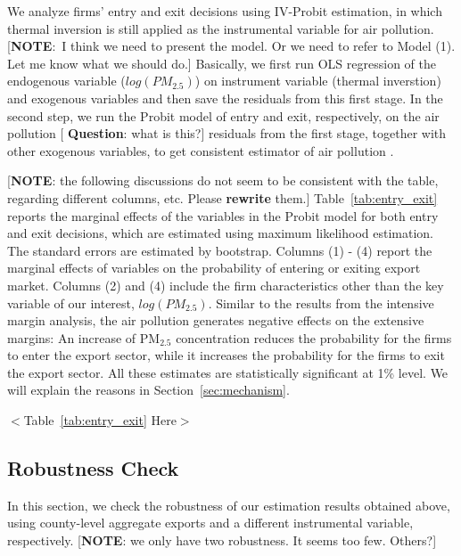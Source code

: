 \documentclass[12pt]{article}
\begin{document}
We analyze firms' entry and exit decisions using IV-Probit estimation, in
which thermal inversion is still applied as the instrumental variable for
air pollution. [\textbf{NOTE}:\ I think we need to present the model. Or we
need to refer to Model (1). Let me know what we should do.] Basically, we
first run OLS regression of the endogenous variable ($log(PM_{2.5})$) on
instrument variable (thermal inverstion) and exogenous variables and then
save the residuals from this first stage. In the second step, we run the
Probit model of entry and exit, respectively, on the air pollution [\textbf{%
Question}: what is this?] residuals from the first stage, together with
other exogenous variables, to get consistent estimator of air pollution %
\citep{wooldridge2010econometric}. 

[\textbf{NOTE}: the following discussions do not seem to be consistent with
the table, regarding different columns, etc. Please \textbf{rewrite} them.]
Table~\ref{tab:entry_exit} reports the marginal effects of the variables in
the Probit model for both entry and exit decisions, which are estimated
using maximum likelihood estimation. The standard errors are estimated by
bootstrap. Columns (1) - (4) report the marginal effects of variables on the
probability of entering or exiting export market. Columns (2) and (4)
include the firm characteristics other than the key variable of our
interest, $log(PM_{2.5})$. Similar to the results from the intensive margin
analysis, the air pollution generates negative effects on the extensive
margins: An increase of $\mathrm{PM_{2.5}}$ concentration reduces the
probability for the firms to enter the export sector, while it increases the
probability for the firms to exit the export sector. All these estimates are
statistically significant at 1\% level. We will explain the reasons in
Section~\ref{sec:mechanism}.

\begin{center}
$<$Table~\ref{tab:entry_exit} Here$>$
\end{center}

\subsection{Robustness Check}

In this section, we check the robustness of our estimation results obtained
above, using county-level aggregate exports and a different instrumental
variable, respectively. [\textbf{NOTE}: we only have two robustness. It
seems too few. Others?]
\end{document}
